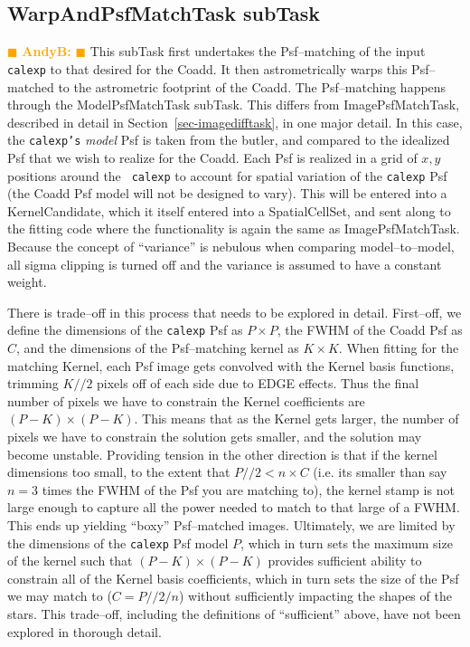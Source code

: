 \documentclass[12pt]{article}
\newcommand{\becker} { \textcolor{orange} {
\ensuremath{\blacksquare} {\bf AndyB:}  
\ensuremath{\blacksquare} } }
\begin{document}
\subsection{WarpAndPsfMatchTask subTask} \becker
This subTask first undertakes the Psf--matching of the input {\tt
  calexp} to that desired for the Coadd.  It then astrometrically
warps this Psf--matched to the astrometric footprint of the Coadd.
The Psf--matching happens through the ModelPsfMatchTask subTask.  This
differs from ImagePsfMatchTask, described in detail in
Section~\ref{sec-imagedifftask}, in one major detail.  In this case,
the {\tt calexp's} {\it model} Psf is taken from the butler, and
compared to the idealized Psf that we wish to realize for the Coadd.
Each Psf is realized in a grid of $x,y$ positions around the {\tt
  calexp} to account for spatial variation of the {\tt calexp} Psf
(the Coadd Psf model will not be designed to vary).  This will be
entered into a KernelCandidate, which it itself entered into a
SpatialCellSet, and sent along to the fitting code where the
functionality is again the same as ImagePsfMatchTask.  Because the
concept of ``variance'' is nebulous when comparing model--to--model,
all sigma clipping is turned off and the variance is assumed to have a
constant weight.


There is trade--off in this process that needs to be explored in
detail.  First--off, we define the dimensions of the {\tt calexp} Psf
as $P \times P$, the FWHM of the Coadd Psf as $C$, and the dimensions
of the Psf--matching kernel as $K \times K$.  When fitting for the
matching Kernel, each Psf image gets convolved with the Kernel basis
functions, trimming $K//2$ pixels off of each side due to EDGE
effects.  Thus the final number of pixels we have to constrain the
Kernel coefficients are $(P-K) \times (P-K)$.  This means that as the
Kernel gets larger, the number of pixels we have to constrain the
solution gets smaller, and the solution may become unstable.
Providing tension in the other direction is that if the kernel
dimensions too small, to the extent that $P//2 < n \times C$ (i.e. its
smaller than say $n=3$ times the FWHM of the Psf you are matching to),
the kernel stamp is not large enough to capture all the power needed
to match to that large of a FWHM.  This ends up yielding ``boxy''
Psf--matched images.  Ultimately, we are limited by the dimensions of
the {\tt calexp} Psf model $P$, which in turn sets the maximum size of
the kernel such that $(P-K) \times (P-K)$ provides sufficient ability
to constrain all of the Kernel basis coefficients, which in turn sets
the size of the Psf we may match to ($C = P//2 / n$) without
sufficiently impacting the shapes of the stars.  This trade--off,
including the definitions of ``sufficient'' above, have not been
explored in thorough detail.
\end{document}
